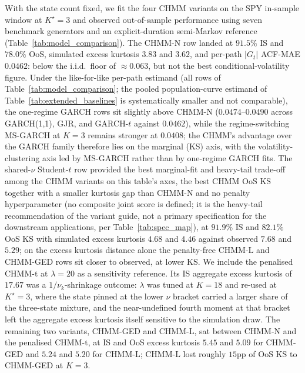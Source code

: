 With the state count fixed, we fit the four CHMM variants on the SPY in-sample window at $K^\star = 3$ and observed out-of-sample performance using seven benchmark generators and an explicit-duration semi-Markov reference (Table~\ref{tab:model_comparison}). The CHMM-N row landed at $91.5\%$ IS and $78.0\%$ OoS, simulated excess kurtosis $3.83$ and $3.62$, and per-path $|G_t|$ ACF-MAE $0.0462$: below the i.i.d.\ floor of $\approx 0.063$, but not the best conditional-volatility figure. Under the like-for-like per-path estimand (all rows of Table~\ref{tab:model_comparison}; the pooled population-curve estimand of Table~\ref{tab:extended_baselines} is systematically smaller and not comparable), the one-regime GARCH rows sit slightly above CHMM-N ($0.0474$--$0.0490$ across GARCH(1,1), GJR, and GARCH-$t$ against $0.0462$), while the regime-switching MS-GARCH at $K = 3$ remains stronger at $0.0408$; the CHMM's advantage over the GARCH family therefore lies on the marginal (KS) axis, with the volatility-clustering axis led by MS-GARCH rather than by one-regime GARCH fits. The shared-$\nu$ Student-$t$ row provided the best marginal-fit and heavy-tail trade-off among the CHMM variants on this table's axes, the best CHMM OoS KS together with a smaller kurtosis gap than CHMM-N and no penalty hyperparameter (no composite joint score is defined; it is the heavy-tail recommendation of the variant guide, not a primary specification for the downstream applications, per Table~\ref{tab:spec_map}), at $91.9\%$ IS and $82.1\%$ OoS KS with simulated excess kurtosis $4.68$ and $4.46$ against observed $7.68$ and $5.29$; on the excess kurtosis distance alone the penalty-free CHMM-L and CHMM-GED rows sit closer to observed, at lower KS. We include the penalised CHMM-t at $\lambda = 20$ as a sensitivity reference. Its IS aggregate excess kurtosis of $17.67$ was a $1/\nu_k$-shrinkage outcome: $\lambda$ was tuned at $K = 18$ and re-used at $K^\star = 3$, where the state pinned at the lower $\nu$ bracket carried a larger share of the three-state mixture, and the near-undefined fourth moment at that bracket left the aggregate excess kurtosis itself sensitive to the simulation draw. The remaining two variants, CHMM-GED and CHMM-L, sat between CHMM-N and the penalised CHMM-t, at IS and OoS excess kurtosis $5.45$ and $5.09$ for CHMM-GED and $5.24$ and $5.20$ for CHMM-L; CHMM-L lost roughly $15$pp of OoS KS to CHMM-GED at $K = 3$.

